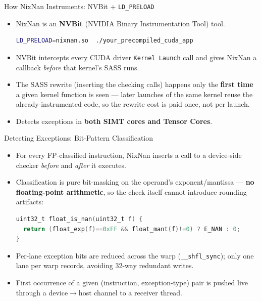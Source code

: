 \documentclass[aspectratio=169,11pt]{beamer}
\begin{document}
\begin{frame}[fragile]{How NixNan Instruments: NVBit + \texttt{LD\_PRELOAD}}
\begin{itemize}
  \item NixNan is an \textbf{NVBit} (NVIDIA Binary Instrumentation Tool) tool.
\begin{lstlisting}[language=bash]
LD_PRELOAD=nixnan.so  ./your_precompiled_cuda_app
\end{lstlisting}
  \item NVBit intercepts every CUDA driver \texttt{Kernel Launch} call and
    gives NixNan a callback \emph{before} that kernel's SASS runs.
  \item The SASS rewrite (inserting the checking calls) happens only the
    \textbf{first time} a given kernel function is seen --- later launches of
    the same kernel reuse the already-instrumented code, so the rewrite cost
    is paid once, not per launch.
  \item Detects exceptions in \textbf{both SIMT cores and Tensor Cores}.
\end{itemize}
\end{frame}

\begin{frame}[fragile]{Detecting Exceptions: Bit-Pattern Classification}
\begin{itemize}
  \item For every FP-classified instruction, NixNan inserts a call to a
    device-side checker \emph{before} and \emph{after} it executes.
  \item Classification is pure bit-masking on the operand's exponent/mantissa
    --- \textbf{no floating-point arithmetic}, so the check itself cannot
    introduce rounding artifacts:
\begin{lstlisting}[language=C]
uint32_t float_is_nan(uint32_t f) {
  return (float_exp(f)==0xFF && float_mant(f)!=0) ? E_NAN : 0;
}
\end{lstlisting}
  \item Per-lane exception bits are reduced across the warp
    (\texttt{\_\_shfl\_sync}); only one lane per warp records, avoiding
    32-way redundant writes.
  \item First occurrence of a given (instruction, exception-type) pair is
    pushed live through a device$\to$host channel to a receiver thread.
\end{itemize}
\end{frame}
\end{document}
